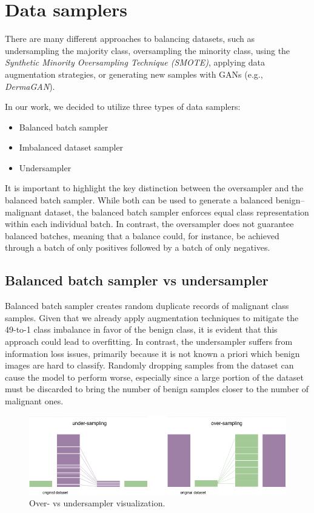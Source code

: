 \section{Data samplers}

There are many different approaches to balancing datasets, such as undersampling the majority class, oversampling the minority class, using the \textit{Synthetic Minority Oversampling Technique (SMOTE)}, applying data augmentation strategies, or generating new samples with GANs (e.g., \textit{DermaGAN}).

In our work, we decided to utilize three types of data samplers:
\begin{itemize}
    \item Balanced batch sampler
    \item Imbalanced dataset sampler
    \item Undersampler
\end{itemize}

It is important to highlight the key distinction between the oversampler and the balanced batch sampler. While both can be used to generate a balanced benign–malignant dataset, the balanced batch sampler enforces equal class representation within each individual batch. In contrast, the oversampler does not guarantee balanced batches, meaning that a balance could, for instance, be achieved through a batch of only positives followed by a batch of only negatives.

\subsection{Balanced batch sampler vs undersampler}

Balanced batch sampler creates random duplicate records of malignant class samples. Given that we already apply augmentation techniques to mitigate the 49-to-1 class imbalance in favor of the benign class, it is evident that this approach could lead to overfitting.
In contrast, the undersampler suffers from information loss issues, primarily because it is not known a priori which benign images are hard to classify. Randomly dropping samples from the dataset can cause the model to perform worse, especially since a large portion of the dataset must be discarded to bring the number of benign samples closer to the number of malignant ones.

\vspace{1em}
\begin{figure}[htbp]
\centering
\includegraphics[width=\linewidth]{figures/over_vs_under_sampler.png}
\caption{Over- vs undersampler visualization.}
\label{fig:over_under_sampler}
\end{figure}

